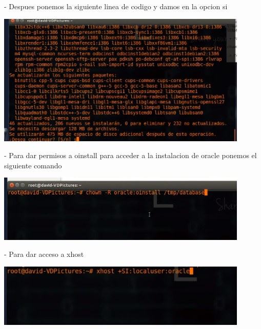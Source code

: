 \documentclass[12pt,letterpaper]{article}
\begin{document}
\begin{itemize}
- Despues ponemos la siguiente linea de codigo y damos en la opcion si\\
\end{itemize}

\begin{center}
	\includegraphics[width=12cm]{./Imagenes/31} 
\end{center}


\begin{itemize}
- Para dar permisos a oinstall para acceder a la instalacion de oracle ponemos el siguiente comando\\
\end{itemize}

\begin{center}
	\includegraphics[width=12cm]{./Imagenes/32} 
\end{center}




\begin{itemize}
- Para dar acceso a xhost\\
\end{itemize}

\begin{center}
	\includegraphics[width=12cm]{./Imagenes/33} 
\end{center}
\end{document}
